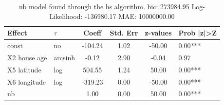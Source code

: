 \begin{table}
	\caption{nb model found through the hs algorithm. bic: 273984.95 Log-Likelihood: -136980.17 MAE: 10000000.00}
	\begin{center}
		\begin{tabular}{|l|l|c|c|c|l|}
			\hline
			Effect & $\tau$ & Coeff & Std. Err & z-values & Prob |z|>Z \\
			\hline
			const & no & -104.24 & 1.02 & -50.00 & 0.00*** \\
			\hline
			X2 house age & arcsinh & -0.12 & 2.90 & -0.04 & 0.97 \\
			\hline
			X5 latitude & log & 504.55 & 1.24 & 50.00 & 0.00*** \\
			\hline
			X6 longitude & log & -319.23 & 0.00 & -50.00 & 0.00*** \\
			\hline
			nb &  & 1.00 & 0.00 & 50.00 & 0.00*** \\
			\hline
		\end{tabular}
	\end{center}
\end{table}